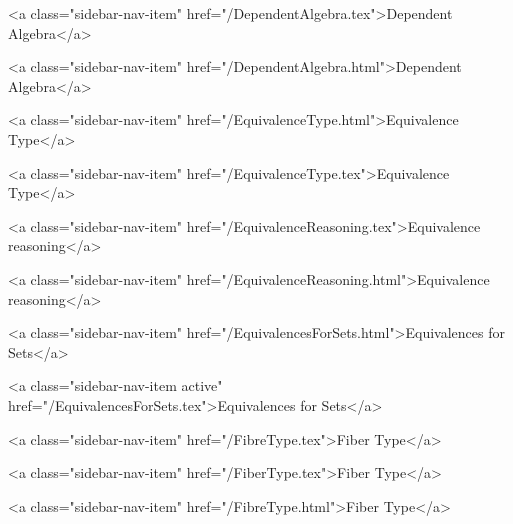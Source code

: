       
        
          <a class="sidebar-nav-item" href="/DependentAlgebra.tex">Dependent Algebra</a>
        
      
    
      
        
          <a class="sidebar-nav-item" href="/DependentAlgebra.html">Dependent Algebra</a>
        
      
    
      
        
          <a class="sidebar-nav-item" href="/EquivalenceType.html">Equivalence Type</a>
        
      
    
      
        
          <a class="sidebar-nav-item" href="/EquivalenceType.tex">Equivalence Type</a>
        
      
    
      
        
          <a class="sidebar-nav-item" href="/EquivalenceReasoning.tex">Equivalence reasoning</a>
        
      
    
      
        
          <a class="sidebar-nav-item" href="/EquivalenceReasoning.html">Equivalence reasoning</a>
        
      
    
      
        
          <a class="sidebar-nav-item" href="/EquivalencesForSets.html">Equivalences for Sets</a>
        
      
    
      
        
          <a class="sidebar-nav-item active" href="/EquivalencesForSets.tex">Equivalences for Sets</a>
        
      
    
      
        
          <a class="sidebar-nav-item" href="/FibreType.tex">Fiber Type</a>
        
      
    
      
        
          <a class="sidebar-nav-item" href="/FiberType.tex">Fiber Type</a>
        
      
    
      
        
          <a class="sidebar-nav-item" href="/FibreType.html">Fiber Type</a>
        
